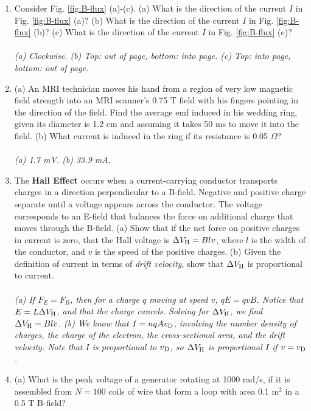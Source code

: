\documentclass[12pt,twocolumn]{article}
\begin{document}
\noindent
\begin{enumerate}
\item Consider Fig. \ref{fig:B-flux} (a)-(c).  (a) What is the direction of the current $I$ in Fig. \ref{fig:B-flux} (a)?  (b) What is the direction of the current $I$ in Fig. \ref{fig:B-flux} (b)?  (c) What is the direction of the current $I$ in Fig. \ref{fig:B-flux} (c)? \\ \\
\textit{(a) Clockwise. (b) Top: out of page, bottom: into page. (c) Top: into page, bottom: out of page.}
\item (a) An MRI technician moves his hand from a region of very low magnetic field strength into an MRI scanner's 0.75 T field with his fingers pointing in the direction of the field. Find the average emf induced in his wedding ring, given its diameter is 1.2 cm and assuming it takes 50 ms to move it into the field. (b) What current is induced in the ring if its resistance is 0.05 $\Omega$? \\ \\
\textit{(a) 1.7 mV. (b) 33.9 mA.}
\item The \textbf{Hall Effect} occurs when a current-carrying conductor transports charges in a direction perpendicular to a B-field.  Negative and positive charge separate until a voltage appears across the conductor.  The voltage corresponds to an E-field that balances the force on additional charge that moves through the B-field.  (a) Show that if the net force on positive charges in current is zero, that the Hall voltage is $\Delta V_{\rm H} = B l v$, where $l$ is the width of the conductor, and $v$ is the speed of the positive charges.  (b) Given the definition of current in terms of \textit{drift velocity}, show that $\Delta V_{\rm H}$ is proportional to current.  \\ \\
\textit{(a) If $F_E = F_B$, then for a charge $q$ moving at speed $v$, $qE = q v B$.  Notice that $E = L \Delta V_{\rm H}$, and that the charge cancels.  Solving for $\Delta V_{\rm H}$, we find $\Delta V_{\rm H} = B l v$. (b) We know that $I = n q A v_{\rm D}$, involving the number density of charges, the charge of the electron, the cross-sectional area, and the drift velocity.  Note that $I$ is proportional to $v_{\rm D}$, so $\Delta V_{\rm H}$ is proportional $I$ if $v = v_{\rm D}$.}
\item (a) What is the peak voltage of a generator rotating at 1000 rad/s, if it is assembled from $N = 100$ coils of wire that form a loop with area 0.1 m$^2$ in a 0.5 T B-field? \\ \\

\end{enumerate}
\end{document}
